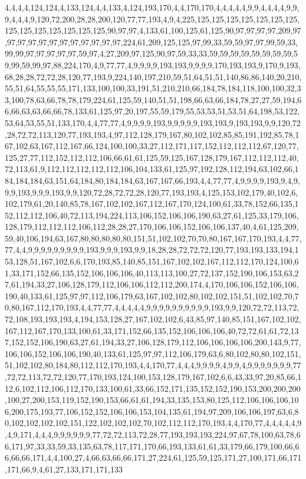 4,4,4,4,124,124,4,133,124,4,4,133,4,124,193,170,4,4,170,170,4,4,4,4,4,9,9,4,4,4,4,9,9,9,4,4,4,9,120,72,200,28,28,200,120,77,77,193,4,9,4,225,125,125,125,125,125,125,125,125,125,125,125,125,125,125,90,97,97,4,133,61,100,125,61,125,90,97,97,97,97,209,97,97,97,97,97,97,97,97,97,97,97,97,224,61,209,125,125,97,99,33,59,59,97,97,99,59,33,99,99,97,97,97,97,97,59,97,4,27,209,97,125,90,97,59,33,33,59,59,59,59,59,59,59,59,59,99,59,99,97,88,224,170,4,9,77,77,4,9,9,9,9,193,193,9,9,9,9,170,193,193,9,170,9,193,68,28,28,72,72,28,120,77,193,9,224,140,197,210,59,51,64,51,51,140,86,86,140,20,210,55,51,64,55,55,55,171,133,100,100,33,191,51,210,210,66,184,78,184,118,100,100,32,33,100,78,63,66,78,78,179,224,61,125,59,140,51,51,198,66,63,66,184,78,27,27,59,194,66,66,63,63,66,66,78,133,61,125,97,20,197,55,59,179,55,53,53,51,53,51,64,198,53,122,53,64,53,55,51,133,170,4,4,77,77,4,9,9,9,9,193,9,9,9,9,9,193,193,9,193,193,9,9,120,72,28,72,72,113,120,77,193,193,4,97,112,128,179,167,80,102,102,85,85,191,192,85,78,167,102,63,167,112,167,66,124,100,100,33,27,112,171,117,152,112,112,112,67,120,77,125,27,77,112,152,112,112,106,66,61,61,125,59,125,167,128,179,167,112,112,112,40,72,113,61,9,112,112,112,112,112,106,104,133,61,125,97,192,128,112,194,63,102,66,184,184,184,63,151,64,184,80,184,184,63,167,167,66,193,4,4,77,77,4,9,9,9,9,193,9,4,9,9,9,193,9,9,9,193,9,9,120,72,28,72,72,28,120,77,193,193,4,125,153,102,179,40,102,6,102,179,61,20,140,85,78,167,102,102,167,112,167,170,124,100,61,33,78,152,66,135,152,112,112,106,40,72,113,194,224,113,106,152,106,106,190,63,27,61,125,33,179,106,128,179,112,112,112,106,112,28,28,27,170,106,106,152,106,106,137,40,4,61,125,209,59,40,106,194,63,167,80,80,80,80,80,151,51,102,102,70,70,80,167,167,170,193,4,4,77,77,4,4,9,9,9,9,9,9,9,9,9,193,9,9,9,193,9,9,18,28,28,72,72,72,120,77,193,193,133,194,153,128,51,167,102,6,6,170,193,85,140,85,151,167,102,102,167,112,112,170,124,100,61,33,171,152,66,135,152,106,106,106,40,113,113,100,27,72,137,152,190,106,153,63,27,61,194,33,27,106,128,179,112,106,106,112,112,200,174,4,170,106,106,152,106,106,190,40,133,61,125,97,97,112,106,179,63,167,102,102,80,102,102,151,51,102,102,70,70,80,167,112,170,193,4,4,77,77,4,4,4,4,4,9,9,9,9,9,9,9,9,9,9,193,9,9,120,72,72,113,72,72,108,193,193,193,4,194,153,128,27,167,102,102,6,43,85,97,140,85,151,167,102,102,167,112,167,170,133,100,61,33,171,152,66,135,152,106,106,106,40,72,72,61,61,72,137,152,152,106,190,63,27,61,194,33,27,106,128,179,112,106,106,106,106,200,143,9,77,106,106,152,106,106,190,40,133,61,125,97,97,112,106,179,63,6,80,102,80,80,102,151,51,102,102,80,184,80,112,112,170,193,4,4,170,77,4,4,4,9,9,9,9,4,9,9,4,9,9,9,9,9,9,9,77,72,72,113,72,72,120,77,170,193,124,100,153,128,179,167,102,6,6,43,33,97,20,85,66,112,6,102,112,106,112,170,133,100,61,33,66,152,171,135,152,152,190,153,200,200,200,100,27,200,153,119,152,190,153,66,61,61,194,33,135,153,80,125,112,106,106,106,106,200,175,193,77,106,152,152,106,106,153,104,135,61,194,97,209,106,106,197,63,6,80,102,102,102,102,151,122,102,102,102,70,102,112,112,170,193,4,4,170,77,4,4,4,4,4,9,4,9,171,4,4,4,9,9,9,9,9,9,77,72,72,113,72,28,77,193,193,193,224,97,67,78,100,63,78,66,171,97,33,33,59,33,135,63,78,117,171,170,66,193,133,61,61,33,179,66,179,100,66,66,66,66,171,4,4,100,27,4,66,63,66,66,171,27,224,61,125,59,125,171,27,100,171,66,171,171,66,9,4,61,27,133,171,171,133